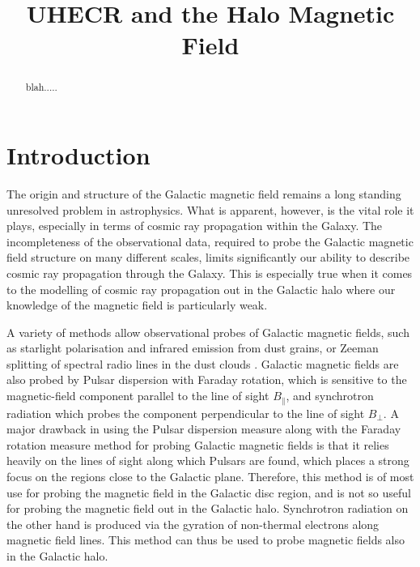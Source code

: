 \documentclass[12pt, a4 paper]{mnras}
\title{UHECR and the Halo Magnetic Field}
\begin{document}
\maketitle

\begin{abstract}
blah.....
\end{abstract}



\section{Introduction}
\label{Introducion}

The origin and structure of the Galactic magnetic field remains a long standing unresolved problem in astrophysics. What is apparent, however, is the vital role it plays, especially in terms of cosmic ray propagation within the Galaxy. The incompleteness of the observational data, required to probe the Galactic magnetic field structure on many different scales, limits significantly our ability to describe cosmic ray propagation through the Galaxy. This is especially true when it comes to the modelling of cosmic ray propagation out in the Galactic halo where our knowledge of the magnetic field is particularly weak.

A variety of methods allow observational probes of Galactic magnetic fields, such as starlight polarisation and infrared emission from dust grains, or Zeeman splitting of spectral radio lines in the dust clouds \textcolor{blue}{\cite{Beck_2007}}. Galactic magnetic fields are also probed by Pulsar dispersion with Faraday rotation, which is sensitive to the magnetic-field component parallel to the line of sight $B_{\parallel}$, and synchrotron radiation which probes the component perpendicular to the line of sight $B_{\perp}$. A major drawback in using the Pulsar dispersion measure along with the Faraday rotation measure method for probing Galactic magnetic fields is that it relies heavily on the lines of sight along which Pulsars are found, which places a strong focus on the regions close to the Galactic plane. Therefore, this method is of most use for probing the magnetic field in the Galactic disc region, and is not so useful for probing the magnetic field out in the Galactic halo. Synchrotron radiation on the other hand is produced via the gyration of non-thermal electrons along magnetic field lines. This method can thus be used to probe magnetic fields also in the Galactic halo.
\end{document}
